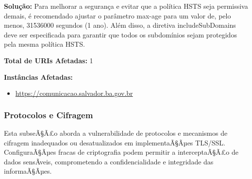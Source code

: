 \documentclass[a4paper,12pt]{article}
\begin{document}
\begin{enumerate}
\textbf{Solução:} Para melhorar a segurança e evitar que a política HSTS seja permissiva demais, é recomendado ajustar o parâmetro max-age para um valor de, pelo menos, 31536000 segundos (1 ano). Além disso, a diretiva includeSubDomains deve ser especificada para garantir que todos os subdomínios sejam protegidos pela mesma política HSTS.

\textbf{Total de URIs Afetadas:} 1

\textbf{Instâncias Afetadas:}
\begin{itemize}
    \item \url{https://comunicacao.salvador.ba.gov.br}
\end{itemize}

\end{enumerate}
\subsubsection{Protocolos e Cifragem}
Esta subseÃ§Ã£o aborda a vulnerabilidade de protocolos e mecanismos de cifragem inadequados ou desatualizados em implementaÃ§Ãµes TLS/SSL. ConfiguraÃ§Ãµes fracas de criptografia podem permitir a interceptaÃ§Ã£o de dados sensÃ­veis, comprometendo a confidencialidade e integridade das informaÃ§Ãµes.
\end{document}
